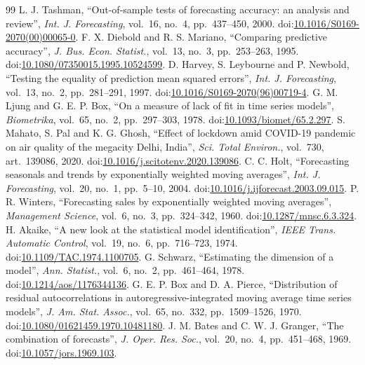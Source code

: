 \documentclass[11pt,a4paper,twoside,twocolumn]{extarticle}
\begin{document}
\begin{thebibliography}{99}
 L. J. Tashman, ``Out-of-sample tests of forecasting accuracy: an analysis and review'', \emph{Int. J. Forecasting}, vol.~16, no.~4, pp.~437--450, 2000. doi:\href{https://doi.org/10.1016/S0169-2070(00)00065-0}{10.1016/S0169-2070(00)00065-0}.
 F. X. Diebold and R. S. Mariano, ``Comparing predictive accuracy'', \emph{J. Bus. Econ. Statist.}, vol.~13, no.~3, pp.~253--263, 1995. doi:\href{https://doi.org/10.1080/07350015.1995.10524599}{10.1080/07350015.1995.10524599}.
 D. Harvey, S. Leybourne and P. Newbold, ``Testing the equality of prediction mean squared errors'', \emph{Int. J. Forecasting}, vol.~13, no.~2, pp.~281--291, 1997. doi:\href{https://doi.org/10.1016/S0169-2070(96)00719-4}{10.1016/S0169-2070(96)00719-4}.
 G. M. Ljung and G. E. P. Box, ``On a measure of lack of fit in time series models'', \emph{Biometrika}, vol.~65, no.~2, pp.~297--303, 1978. doi:\href{https://doi.org/10.1093/biomet/65.2.297}{10.1093/biomet/65.2.297}.
 S. Mahato, S. Pal and K. G. Ghosh, ``Effect of lockdown amid COVID-19 pandemic on air quality of the megacity Delhi, India'', \emph{Sci. Total Environ.}, vol.~730, art.~139086, 2020. doi:\href{https://doi.org/10.1016/j.scitotenv.2020.139086}{10.1016/j.scitotenv.2020.139086}.
 C. C. Holt, ``Forecasting seasonals and trends by exponentially weighted moving averages'', \emph{Int. J. Forecasting}, vol.~20, no.~1, pp.~5--10, 2004. doi:\href{https://doi.org/10.1016/j.ijforecast.2003.09.015}{10.1016/j.ijforecast.2003.09.015}.
 P. R. Winters, ``Forecasting sales by exponentially weighted moving averages'', \emph{Management Science}, vol.~6, no.~3, pp.~324--342, 1960. doi:\href{https://doi.org/10.1287/mnsc.6.3.324}{10.1287/mnsc.6.3.324}.
 H. Akaike, ``A new look at the statistical model identification'', \emph{IEEE Trans. Automatic Control}, vol.~19, no.~6, pp.~716--723, 1974. doi:\href{https://doi.org/10.1109/TAC.1974.1100705}{10.1109/TAC.1974.1100705}.
 G. Schwarz, ``Estimating the dimension of a model'', \emph{Ann. Statist.}, vol.~6, no.~2, pp.~461--464, 1978. doi:\href{https://doi.org/10.1214/aos/1176344136}{10.1214/aos/1176344136}.
 G. E. P. Box and D. A. Pierce, ``Distribution of residual autocorrelations in autoregressive-integrated moving average time series models'', \emph{J. Am. Stat. Assoc.}, vol.~65, no.~332, pp.~1509--1526, 1970. doi:\href{https://doi.org/10.1080/01621459.1970.10481180}{10.1080/01621459.1970.10481180}.
 J. M. Bates and C. W. J. Granger, ``The combination of forecasts'', \emph{J. Oper. Res. Soc.}, vol.~20, no.~4, pp.~451--468, 1969. doi:\href{https://doi.org/10.1057/jors.1969.103}{10.1057/jors.1969.103}.
\end{thebibliography}
\endgroup
\end{document}
